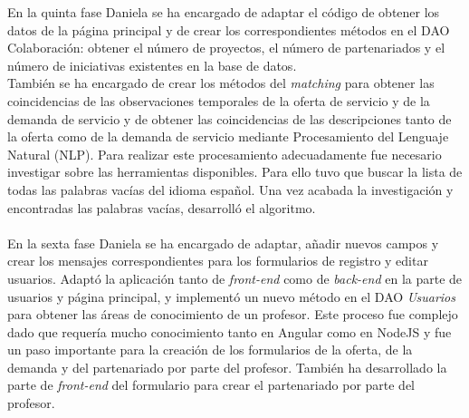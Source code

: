 \documentclass[11pt]{book}
\begin{document}
	En la quinta fase Daniela se ha encargado de adaptar el código de obtener los datos de la página principal y de crear los correspondientes métodos en el DAO Colaboración: obtener el número de proyectos, el número de partenariados y el número de iniciativas existentes en la base de datos.\\ 
	También se ha encargado de crear los métodos del \emph{matching} para obtener las coincidencias de las observaciones temporales de la oferta de servicio y de la demanda de servicio y de obtener las coincidencias de las descripciones tanto de la oferta como de la demanda de servicio mediante Procesamiento del Lenguaje Natural (NLP). Para realizar este procesamiento adecuadamente fue necesario investigar sobre las herramientas disponibles. Para ello tuvo que buscar la lista de todas las palabras vacías del idioma español. Una vez acabada la investigación y encontradas las palabras vacías, desarrolló el algoritmo.\\\\
	En la sexta fase Daniela se ha encargado de adaptar, añadir nuevos campos y crear los mensajes correspondientes para los formularios de registro y editar usuarios. Adaptó la aplicación tanto de \textit{front-end} como de \textit{back-end} en la parte de usuarios y página principal, y implementó un nuevo método en el DAO \textit{Usuarios} para obtener las áreas de conocimiento de un profesor. Este proceso fue complejo dado que requería mucho conocimiento tanto en Angular como en NodeJS y fue un paso importante para la creación de los formularios de la oferta, de la demanda y del partenariado por parte del profesor. También ha desarrollado la parte de \textit{front-end} del formulario para crear el partenariado por parte del profesor.
\end{document}
